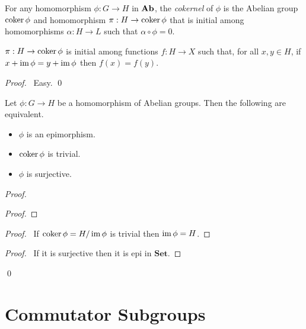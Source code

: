 \begin{df}[Cokernel]
For any homomorphism $\phi : G \rightarrow H$ in $\mathbf{Ab}$, the \emph{cokernel} of $\phi$ is the Abelian group $\operatorname{coker} \phi$ and homomorphism $\pi : H \rightarrow \operatorname{coker} \phi$ that is initial among homomorphisms $\alpha : H \rightarrow L$ such that $\alpha \circ \phi = 0$.
\end{df}

\begin{prop}
$\pi : H \rightarrow \operatorname{coker} \phi$ is initial among functions $f : H \rightarrow X$ such that, for all $x,y \in H$, if $x + \operatorname{im} \phi = y + \operatorname{im} \phi$ then $f(x) = f(y)$.
\end{prop}

\begin{proof}
\pf\ Easy. \qed
\end{proof}

\begin{prop}
Let $\phi : G \rightarrow H$ be a homomorphism of Abelian groups. Then the following are equivalent.
\begin{itemize}
\item $\phi$ is an epimorphism.
\item $\operatorname{coker} \phi$ is trivial.
\item $\phi$ is surjective.
\end{itemize}
\end{prop}

\begin{proof}
\pf
{}
\begin{proof}
\end{proof}
\begin{proof}
	\pf\ If $\operatorname{coker} \phi = H / \operatorname{im} \phi$ is trivial then $\operatorname{im} \phi = H$.
\end{proof}
\begin{proof}
	\pf\ If it is surjective then it is epi in $\mathbf{Set}$.
\end{proof}
\qed
\end{proof}

\section{Commutator Subgroups}

